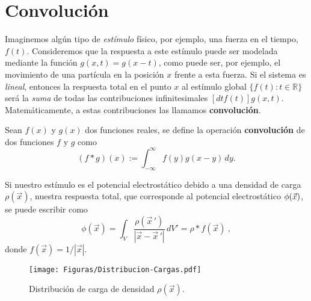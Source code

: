 \section{Convolución}

Imaginemos algún tipo de \emph{estímulo} físico, por ejemplo, una fuerza en el tiempo, $f(t)$. Consideremos que la respuesta a este estímulo puede ser modelada mediante la función $g(x,t) = g(x-t)$, como puede ser, por ejemplo, el movimiento de una partícula en la posición $x$ frente a esta fuerza. Si el sistema es \emph{lineal}, entonces la respuesta total en el punto $x$ al estímulo global $\{f(t) : t \in \mathbb{R} \}$ será la \emph{suma} de todas las contribuciones infinitesimales $[dt f(t)] g(x,t)$. Matemáticamente, a estas contribuciones las llamamos \textbf{convolución}.

\begin{defi}
Sean $f(x)$ y $g(x)$ dos funciones reales, se define la operación \textbf{convolución} de dos funciones $f$ y $g$ como 
\begin{equation}
 (f*g)(x) := \int_{-\infty}^{\infty} f(y) g(x-y) \,dy.   \label{Convolucion}
\end{equation}

\end{defi}


Si nuestro estímulo es el potencial electrostático debido a una densidad de carga $\rho(\Vec{x})$, nuestra respuesta total, que corresponde al potencial electrostático $\phi(\vec{x})$, se puede escribir como
\begin{equation}
    \phi(\Vec{x}) = \int_{V} \frac{\rho(\Vec{x}\,')}{|\Vec{x} - \Vec{x}\,'|} \, dV' = \rho * f(\Vec{x}) \ ,
\end{equation}
donde  $f(\Vec{x}) = 1/|\Vec{x}|$.
\begin{figure}[htbp]
    \centering
    \texttt{[image: Figuras/Distribucion-Cargas.pdf]}
    \caption{Distribución de carga de densidad $\rho(\Vec{x})$.}
    \label{fig:PotencialDistribucion}
\end{figure}

